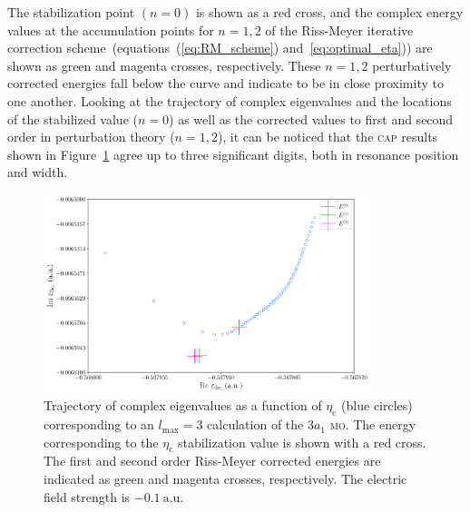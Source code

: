 The stabilization point $(n = 0)$ is shown as a red cross, and the
complex energy values at the accumulation points for $n = 1, 2$ of the
Riss-Meyer iterative correction scheme~(equations~(\ref{eq:RM_scheme})
and~\ref{eq:optimal_eta})) are shown as green and magenta crosses,
respectively. These $n = 1, 2$ perturbatively corrected energies fall
below the curve and indicate to be in close proximity to one
another. Looking at the trajectory of complex eigenvalues and the
locations of the stabilized value ($n = 0$) as well as the corrected
values to first and second order in perturbation theory ($n = 1, 2$),
it can be noticed that the \textsc{cap} results shown in
Figure~\ref{fig:3a1_RMtrajectory} agree up to three significant
digits, both in resonance position and width.



\begin{figure}
  \centering
  \includegraphics[width=0.85\textwidth]{figures/ch_H2O/partial_wave/3a1trajectory.pdf}
  \caption{Trajectory of complex eigenvalues as a function of
    $\eta_{\mathrm{c}}$ (blue circles) corresponding to an
    $l_{\mathrm{max}}=3$ calculation of the $3a_{1}$ \textsc{mo}. The
    energy corresponding to the $\eta_{\mathrm{c}}$ stabilization
    value is shown with a red cross. The first and second order
    Riss-Meyer corrected energies are indicated as green and magenta
    crosses, respectively. The electric field strength is
    $-0.1\ \mathrm{a.u.}$}
  \label{fig:3a1_RMtrajectory}
\end{figure}




















